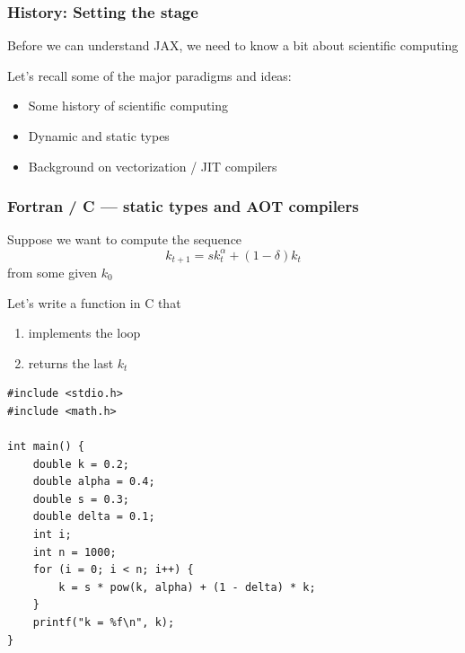 \begin{frame}
    \frametitle{History: Setting the stage}

    Before we can understand JAX, we need to know a bit about scientific
    computing

    \vspace{0.5em}
    Let's recall some of the major paradigms and ideas:

    \vspace{0.5em}
    \begin{itemize}
        \item Some history of scientific computing
    \vspace{0.5em}
        \item Dynamic and static types
    \vspace{0.5em}
        \item Background on vectorization / JIT compilers
    \end{itemize}

\end{frame}
    


\begin{frame}
    \frametitle{Fortran / C  --- static types and AOT compilers}


    \Eg Suppose we want to compute the sequence
    \begin{equation*}
        k_{t+1} = s k_t^\alpha + (1 - \delta) k_t
    \end{equation*}
    from some given $k_0$ 

        \vspace{0.5em}
        \vspace{0.5em}
        \vspace{0.5em}

    Let's write a function in C that 
    \begin{enumerate}
        \item implements the loop 
        \vspace{0.5em}
        \item returns the last $k_t$
    \end{enumerate}


\end{frame}

\begin{frame}[fragile]
    
    \begin{verbatim}
#include <stdio.h>
#include <math.h>

int main() {
    double k = 0.2;
    double alpha = 0.4;
    double s = 0.3;
    double delta = 0.1;
    int i;
    int n = 1000;
    for (i = 0; i < n; i++) {
        k = s * pow(k, alpha) + (1 - delta) * k;
    }
    printf("k = %f\n", k);
}
    \end{verbatim}

\end{frame}



